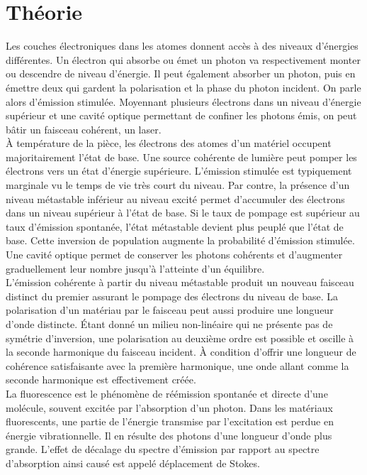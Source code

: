 \documentclass[10pt,letterpaper,twocolumn]{article}
\begin{document}
\section{Théorie}
Les couches électroniques dans les atomes donnent accès à des niveaux d'énergies différentes. Un électron qui absorbe ou émet un photon va respectivement monter ou descendre de niveau d'énergie. Il peut également absorber un photon, puis en émettre deux qui gardent la polarisation et la phase du photon incident. On parle alors d'émission stimulée. Moyennant plusieurs électrons dans un niveau d'énergie supérieur et une cavité optique permettant de confiner les photons émis, on peut bâtir un faisceau cohérent, un laser. \\

À température de la pièce, les électrons des atomes d'un matériel occupent majoritairement l'état de base. Une source cohérente de lumière peut pomper les électrons vers un état d'énergie supérieure. L'émission stimulée est typiquement marginale vu le temps de vie très court du niveau. Par contre, la présence d'un niveau métastable inférieur au niveau excité permet d'accumuler des électrons dans un niveau supérieur à l'état de base. Si le taux de pompage est supérieur au taux d'émission spontanée, l'état métastable devient plus peuplé que l'état de base. Cette inversion de population augmente la probabilité d'émission stimulée. Une cavité optique permet de conserver les photons cohérents et d'augmenter graduellement leur nombre jusqu'à l'atteinte d'un équilibre.\\

L'émission cohérente à partir du niveau métastable produit un nouveau faisceau distinct du premier assurant le pompage des électrons du niveau de base. La polarisation d'un matériau par le faisceau peut aussi produire une longueur d'onde distincte. Étant donné un milieu non-linéaire qui ne présente pas de symétrie d'inversion, une polarisation au deuxième ordre est possible et oscille à la seconde harmonique du faisceau incident. À condition d'offrir une longueur de cohérence satisfaisante avec la première harmonique, une onde allant comme la seconde harmonique est effectivement créée.\\

La fluorescence est le phénomène de réémission spontanée et directe d'une molécule, souvent excitée par l'absorption d'un photon. Dans les matériaux fluorescents,  une partie de l'énergie transmise par l'excitation est perdue en énergie vibrationnelle. Il en résulte des photons d'une longueur d'onde plus grande. L'effet de décalage du spectre d'émission par rapport au spectre d'absorption ainsi causé est appelé déplacement de Stokes.\\
\end{document}
